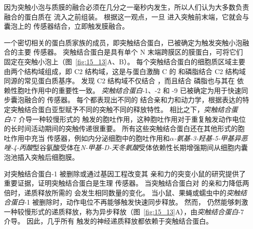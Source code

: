 因为突触小泡与质膜的融合必须在几分之一毫秒内发生，所以人们认为大多数负责融合的蛋白质在  流入之前组装。
根据这一观点，一旦  进入突触前末端，它就会与囊泡上的  传感器结合，立即触发膜融合。


一个密切相关的蛋白质家族的成员，即突触结合蛋白，已被确定为触发突触小泡融合的主要  传感器。
突触结合蛋白是具有单个 N 末端跨膜区的膜蛋白，可将它们固定在突触小泡上（图~\ref{fig:15_13}A、B）。
每个突触结合蛋白的细胞质区域主要由两个结构域组成，即 C2 结构域，这是与蛋白激酶 C 的  和磷脂结合 C2 结构域同源的常见蛋白质基序。
发现 C2 结构域不仅结合 ，而且结合 磷脂也与其在  依赖性胞吐作用中的重要性一致。
\textit{突触结合蛋白}-1、-2 和 -9 已被确定为用于快速同步囊泡融合的  传感器。
每个都表现出不同的  结合亲和力和动力学，根据表达的特定突触结合蛋白亚型赋予不同的突触不同的释放特性。
相比之下，\textit{突触结合蛋白}-7 介导一种较慢形式的  触发的胞吐作用，这种胞吐作用对于重复触发动作电位的长时间活动期间的突触传递很重要。
所有这些突触结合蛋白还在其他形式的胞吐作用中充当  传感器，例如内分泌细胞中的胞吐作用和\textit{$\alpha$-氨基-3-羟基-5-甲基异恶唑-4-丙酸}型谷氨酸受体在\textit{N-甲基-D-天冬氨酸}受体依赖性长期增强期间从细胞内囊泡池插入突触后细胞膜。


对突触结合蛋白-1 被删除或通过基因工程改变其  亲和力的突变小鼠的研究提供了重要证据，证明突触结合蛋白是生理  传感器。
当突触结合蛋白对  的亲和力降低两倍时，递质释放所需的  会发生相同数量的变化。
当小鼠、果蝇或蠕虫中的\textit{突触结合蛋白}-1 被删除时，动作电位不再能够触发快速同步释放。
然而， 仍然能够刺激一种较慢形式的递质释放，称为异步释放（图~\ref{fig:15_13}A），由\textit{突触结合蛋白}-7 介导。
因此，几乎所有  触发的神经递质释放都依赖于突触结合蛋白。


